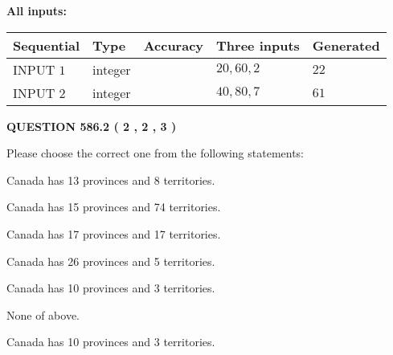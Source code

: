 \documentclass[12pt]{article}
\begin{document}
   
   
   
\noindent{}
   
   
   
   
\noindent\vspace{0.1in}\hspace{-0.08in} {\textbf{\Large{All inputs: }}}
   
   
  
  
\noindent\begin{tabular}{|l|l|l|l|l|}
\hline
 Sequential & Type & Accuracy & Three inputs & Generated \\ 
\hline
 
 
  INPUT $  1 $ & integer &  & $
 20
 , 
 60
 , 
 2
 $ & $ 22 $ 
 \\  \hline  
 
 
  INPUT $  2 $ & integer &  & $
 40
 , 
 80
 , 
 7
 $ & $ 61 $ 
 \\  \hline  
 \end{tabular}
   
   
  
\vspace{0.2in}
  
{\textbf{\Large{QUESTION
586.2 
 ( 2 , 2 , 3 )
}}}
  
  
Please choose the correct one from the following statements:
 
 
Canada has  13 provinces and  8 territories.
 
 
Canada has  15 provinces and  74 territories.
 
 
Canada has  17 provinces and  17 territories.
 
 
Canada has  26 provinces and  5 territories.
 
 
Canada has 10  provinces and 3 territories.
 
 
 None of above.
 
 
\noindent{}
 
 
Canada has 10  provinces and 3 territories.
 
 
\noindent{}
 
 
   
\end{document}
